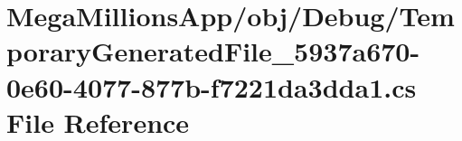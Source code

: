 \hypertarget{obj_2_debug_2_temporary_generated_file__5937a670-0e60-4077-877b-f7221da3dda1_8cs}{}\section{Mega\+Millions\+App/obj/\+Debug/\+Temporary\+Generated\+File\+\_\+5937a670-\/0e60-\/4077-\/877b-\/f7221da3dda1.cs File Reference}
\label{obj_2_debug_2_temporary_generated_file__5937a670-0e60-4077-877b-f7221da3dda1_8cs}
